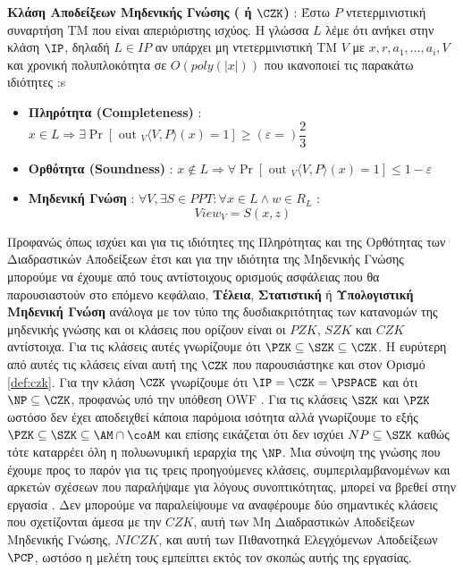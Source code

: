 \begin{definition}
\label{def:czk}
\textbf{Κλάση Αποδείξεων Μηδενικής Γνώσης ( ή $\CZK$)} : Έστω $P$ ντετερμινιστική συναρτήση ΤΜ που είναι απεριόριστης ισχύος. Η γλώσσα $L$ λέμε ότι ανήκει στην κλάση $\IP$, δηλαδή $L \in IP$ αν υπάρχει μη ντετερμινιστική ΤΜ $V$ με $x, r, a_{1}, \ldots, a_{i}, V$ και χρονική πολυπλοκότητα σε $O(poly(|x|))$ που ικανοποιεί τις παρακάτω ιδιότητες :s
\begin{itemize}
    \item \textbf{Πληρότητα (Completeness)} : $x \in L \Rightarrow \exists \operatorname{Pr}\left[\text { out }_{V}\langle V, P\rangle(x)=1\right] \geq (ε=) \dfrac{2}{3}$
    \item \textbf{Ορθότητα (Soundness)} : $x \notin L \Rightarrow \forall \operatorname{Pr}\left[\text { out }_{V}\langle V, P\rangle(x)=1\right] \leq 1 - ε$
    \item \textbf{Μηδενική Γνώση} : $\forall V, \exists S \in PPT : \forall x \in L \wedge w \in R_L$ :
    $$
    View_V = S(x,z)
    $$
\end{itemize}
\end{definition}

Προφανώς όπως ισχύει και για τις ιδιότητες της Πληρότητας και της Ορθότητας των Διαδραστικών Αποδείξεων έτσι και για την ιδιότητα της Μηδενικής Γνώσης μπορούμε να έχουμε από τους αντίστοιχους ορισμούς ασφάλειας που θα παρουσιαστούν στο επόμενο κεφάλαιο, \textbf{Τέλεια}, \textbf{Στατιστική} ή \textbf{Υπολογιστική Μηδενική Γνώση} ανάλογα με τον τύπο της δυσδιακριτότητας των κατανομών της μηδενικής γνώσης και οι κλάσεις που ορίζουν είναι οι $PZK$, $SZK$ και $CZK$ αντίστοιχα. Για τις κλάσεις αυτές γνωρίζουμε ότι $\PZK \subseteq \SZK \subseteq \CZK$. Η ευρύτερη από αυτές τις κλάσεις είναι αυτή της $\CZK$ που παρουσιάστηκε και στον Ορισμό \ref{def:czk}. Για την κλάση $\CZK$ γνωρίζουμε ότι $\IP=\CZK=\PSPACE$ και ότι $\NP \subseteq \CZK$, προφανώς υπό την υπόθεση OWF \cite{ben1988everything}. Για τις κλάσεις $\SZK$ και $\PZK$ ωστόσο δεν έχει αποδειχθεί κάποια παρόμοια ισότητα αλλά γνωρίζουμε το εξής $\PZK \subseteq \SZK \subseteq \AM \cap \coAM$ και επίσης εικάζεται ότι δεν ισχύει $NP \subseteq \SZK$ καθώς τότε καταρρέει όλη η πολυωνυμική ιεραρχία της $\NP$. Μια σύνοψη της γνώσης που έχουμε προς το παρόν για τις τρεις προηγούμενες κλάσεις, συμπεριλαμβανομένων και αρκετών σχέσεων που παραλήψαμε για λόγους συνοπτικότητας, μπορεί να βρεθεί στην εργασία \cite{couteau2017zero}. Δεν μπορούμε να παραλείψουμε να αναφέρουμε δύο σημαντικές κλάσεις που σχετίζονται άμεσα με την $CZK$, αυτή των Μη Διαδραστικών Αποδείξεων Μηδενικής Γνώσης, $NICZK$, και αυτή των Πιθανοτηκά Ελεγχόμενων Αποδείξεων $\PCP$, ωστόσο η μελέτη τους εμπείπτει εκτός τον σκοπώς αυτής της εργασίας.

